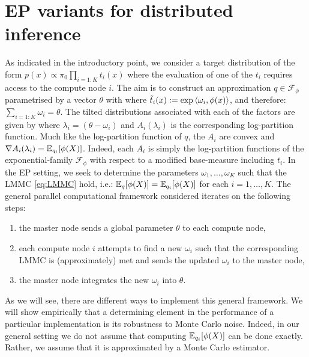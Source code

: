 \section{EP variants for distributed inference}
As indicated in the introductory point, we consider a target distribution of the form $p(x)\propto \pi_0\prod_{i=1:K}t_i(x)$ where the evaluation of one of the $t_i$ requires access to the compute node $i$. The aim is to construct an approximation $q\in\mathcal F_\phi$ parametrised by a vector $\theta$ with
%
%
where $\tilde t_i(x):=\exp\left\langle \omega_i,\phi(x) \right\rangle$, and therefore: $\sum_{i=1:K}\omega_i=\theta$. The tilted distributions associated with each of the factors are given by
%
% 
where $\lambda_i=(\theta-\omega_i)$ and $A_i(\lambda_i)$ is the corresponding log-partition function. Much like the log-partition function of $q$, the $A_i$ are convex and $\nabla A_i(\lambda_i)=\mathbb E_{q_i}[\phi(X)]$. Indeed, each $A_i$ is simply the log-partition functions of the exponential-family $\mathcal F_\phi$ with respect to a modified base-measure including $t_i$.
In the EP setting, we seek to determine the parameters $\omega_1,\dots,\omega_K$ such that the LMMC \eqref{eq:LMMC} hold, i.e.: $\mathbb E_q[\phi(X)]=\mathbb E_{q_i}[\phi(X)]$ for each $i=1,\dots,K$.
The general parallel computational framework considered iterates on the following steps:
\begin{enumerate}\itsepa
	\item the master node sends a global parameter $\theta$ to each compute node,
	\item each compute node $i$ attempts to find a new $\omega_i$ such that the corresponding LMMC is (approximately) met and sends the updated $\omega_i$ to the master node,
	\item the master node integrates the new $\omega_i$ into $\theta$.
\end{enumerate} 

As we will see, there are different ways to implement this general framework.
We will show empirically that a determining element in the performance of a particular implementation is its robustness to Monte Carlo noise. 
Indeed, in our general setting we do not assume that computing $\mathbb E_{q_i}[\phi(X)]$ can be done exactly. Rather, we assume that it is approximated by a Monte Carlo estimator.
